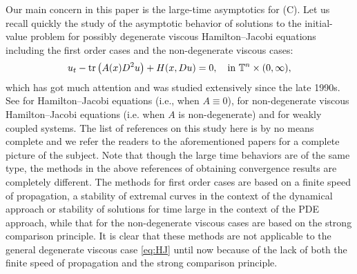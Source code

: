 \documentclass[12pt,reqno]{amsart}
\theoremstyle{plain}
\theoremstyle{remark}
\numberwithin{equation}{section}
\begin{document}
Our main concern in this paper is the large-time asymptotics for (C). 
Let us recall quickly the study of the asymptotic behavior of solutions to 
the initial-value problem for possibly degenerate viscous Hamilton--Jacobi equations 
including the first order cases and the non-degenerate viscous cases:  
\begin{equation}\label{eq:HJ}
u_t-{{\rm tr}\,}\big(A(x)D^2u\big)+H(x,Du)=0, \quad \text{in} \ {\mathbb{T}^{n}\times(0,\infty)},  
\end{equation}
which has got much attention and was studied extensively since the late 1990s. 
See \cite{NR, BS, DS,F2,I2008} for Hamilton--Jacobi equations (i.e., when $A\equiv 0$),  
\cite{BS2,IS} for non-degenerate viscous Hamilton--Jacobi equations (i.e. when $A$ is non-degenerate) and \cite{MT3} for  weakly coupled systems. The list of references on this study
here is by no means complete and we refer the readers 
to the aforementioned papers for a complete picture
of the subject.   
Note that though the large time behaviors are of the same type,
the methods in the above references of obtaining convergence results 
are completely different. 
The methods for first order cases are based on a finite speed of propagation, 
a stability of extremal curves in the context of the dynamical approach 
or stability of solutions for time large in the context of the PDE approach, 
while that for the non-degenerate viscous cases are based on the strong comparison principle.
It is clear that these methods are not applicable to the general degenerate viscous case \eqref{eq:HJ} until now because of the lack of both the finite speed of propagation and the strong comparison principle.
\end{document}
